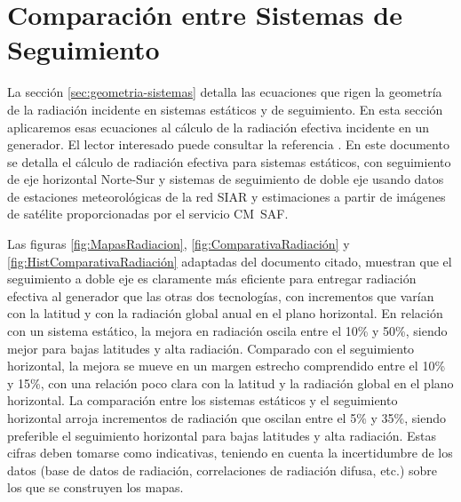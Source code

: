 \section{Comparación entre Sistemas de Seguimiento}
\label{sec:comparacion-sistemas}

La sección \ref{sec:geometria-sistemas} detalla las ecuaciones que
rigen la geometría de la radiación incidente en sistemas estáticos y
de seguimiento. En esta sección aplicaremos esas ecuaciones al cálculo
de la radiación efectiva incidente en un generador. El lector
interesado puede consultar la referencia
\cite{Antonanzas-Torres.Canizares.ea2013}. En este documento se
detalla el cálculo de radiación efectiva para sistemas estáticos, con
seguimiento de eje horizontal Norte-Sur y sistemas de seguimiento de
doble eje usando datos de estaciones meteorológicas de la red
SIAR\cite{SIAR2011} y estimaciones a partir de imágenes de satélite
proporcionadas por el servicio CM~SAF\cite{Posselt.Muller.ea2011}.

Las figuras \ref{fig:MapasRadiacion}, \ref{fig:ComparativaRadiación} y
\ref{fig:HistComparativaRadiación} adaptadas del documento citado,
muestran que el seguimiento a doble eje es claramente más eficiente
para entregar radiación efectiva al generador que las otras dos
tecnologías, con incrementos que varían con la latitud y con la
radiación global anual en el plano horizontal. En relación con un
sistema estático, la mejora en radiación oscila entre el 10\% y 50\%,
siendo mejor para bajas latitudes y alta radiación. Comparado con el
seguimiento horizontal, la mejora se mueve en un margen estrecho
comprendido entre el 10\% y 15\%, con una relación poco clara con la
latitud y la radiación global en el plano horizontal.  La comparación
entre los sistemas estáticos y el seguimiento horizontal arroja
incrementos de radiación que oscilan entre el 5\% y 35\%, siendo
preferible el seguimiento horizontal para bajas latitudes y alta
radiación. Estas cifras deben tomarse como indicativas, teniendo en
cuenta la incertidumbre de los datos (base de datos de radiación,
correlaciones de radiación difusa, etc.) sobre los que se construyen
los mapas.

